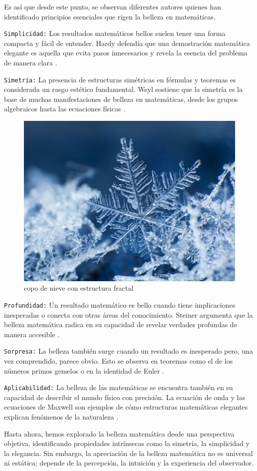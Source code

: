 \documentclass[twocolumn]{article}
\begin{document}
Es así que desde este punto, se observan diferentes autores quienes han identificado principios esenciales que rigen la belleza en matemáticas.

\texttt{Simplicidad:} Los resultados matemáticos bellos suelen tener una forma compacta y fácil de entender. Hardy defendía que una demostración matemática elegante es aquella que evita pasos innecesarios y revela la esencia del problema de manera clara \cite{hardy1940}.
    
\texttt{Simetría:} La presencia de estructuras simétricas en fórmulas y teoremas es considerada un rasgo estético fundamental. Weyl sostiene que la simetría es la base de muchas manifestaciones de belleza en matemáticas, desde los grupos algebraicos hasta las ecuaciones físicas \cite{weyl1952}.

\begin{figure} [h]
    \centering
    \includegraphics[width=0.5\linewidth]{imagen3.png}
    \caption{copo de nieve con estructura fractal}
    \label{fig:enter-label}
\end{figure}
    
\texttt{Profundidad:} Un resultado matemático es bello cuando tiene implicaciones inesperadas o conecta con otras áreas del conocimiento. Steiner argumenta que la belleza matemática radica en su capacidad de revelar verdades profundas de manera accesible \cite{steiner2001}.
    
\texttt{Sorpresa:} La belleza también surge cuando un resultado es inesperado pero, una vez comprendido, parece obvio. Esto se observa en teoremas como el de los números primos gemelos o en la identidad de Euler \cite{francis2015}.
    
\texttt{Aplicabilidad:} La belleza de las matemáticas se encuentra también en su capacidad de describir el mundo físico con precisión. La ecuación de onda y las ecuaciones de Maxwell son ejemplos de cómo estructuras matemáticas elegantes explican fenómenos de la naturaleza \cite{livio2017}.


Hasta ahora, hemos explorado la belleza matemática desde una perspectiva objetiva, identificando propiedades intrínsecas como la simetría, la simplicidad y la elegancia. Sin embargo, la apreciación de la belleza matemática no es universal ni estática; depende de la percepción, la intuición y la experiencia del observador. 
\end{document}
